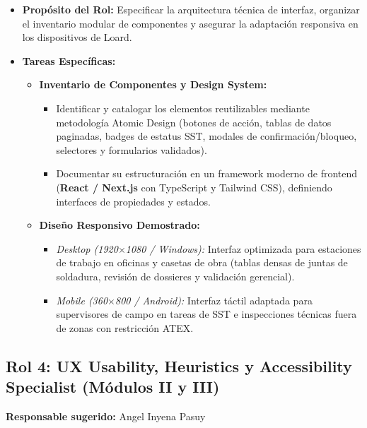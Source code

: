 \documentclass[11pt,letterpaper]{article}
\begin{document}
\begin{itemize}
    \item \textbf{Propósito del Rol:} Especificar la arquitectura técnica de interfaz, organizar el inventario modular de componentes y asegurar la adaptación responsiva en los dispositivos de Loard.
    \item \textbf{Tareas Específicas:}
    \begin{itemize}
        \item \textbf{Inventario de Componentes y Design System:}
        \begin{itemize}
            \item Identificar y catalogar los elementos reutilizables mediante metodología Atomic Design (botones de acción, tablas de datos paginadas, badges de estatus SST, modales de confirmación/bloqueo, selectores y formularios validados).
            \item Documentar su estructuración en un framework moderno de frontend (\textbf{React / Next.js} con TypeScript y Tailwind CSS), definiendo interfaces de propiedades y estados.
        \end{itemize}
        \item \textbf{Diseño Responsivo Demostrado:}
        \begin{itemize}
            \item \emph{Desktop (1920$\times$1080 / Windows):} Interfaz optimizada para estaciones de trabajo en oficinas y casetas de obra (tablas densas de juntas de soldadura, revisión de dossieres y validación gerencial).
            \item \emph{Mobile (360$\times$800 / Android):} Interfaz táctil adaptada para supervisores de campo en tareas de SST e inspecciones técnicas fuera de zonas con restricción ATEX.
        \end{itemize}
    \end{itemize}
\end{itemize}

\subsection{Rol 4: UX Usability, Heuristics y Accessibility Specialist (Módulos II y III)}
\textbf{Responsable sugerido:} Angel Inyena Pasuy
\end{document}
